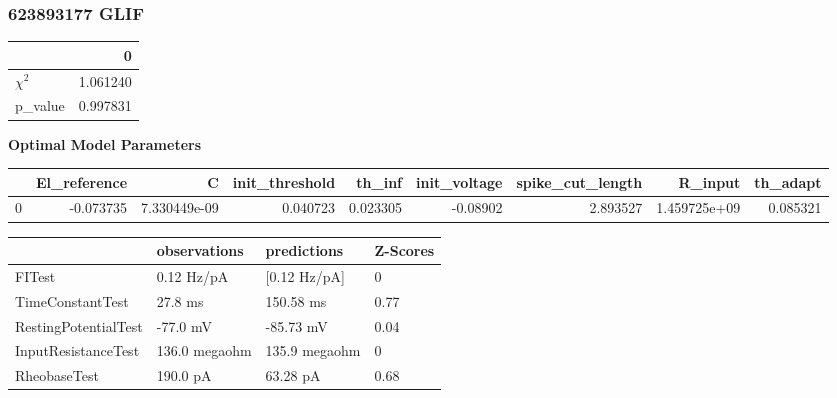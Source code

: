 \subsubsection{623893177 GLIF}\begin{tabular}{lr}
\toprule
{} &         0 \\
\midrule
$\chi^{2}$ &  1.061240 \\
p\_value    &  0.997831 \\
\bottomrule
\end{tabular}
\textbf{Optimal Model Parameters} \begin{tabular}{lrrrrrrrr}
\toprule
{} &  El\_reference &             C &  init\_threshold &    th\_inf &  init\_voltage &  spike\_cut\_length &       R\_input &  th\_adapt \\
\midrule
0 &     -0.073735 &  7.330449e-09 &        0.040723 &  0.023305 &      -0.08902 &          2.893527 &  1.459725e+09 &  0.085321 \\
\bottomrule
\end{tabular}
\begin{tabular}{llll}
\toprule
{} &   observations &    predictions & Z-Scores \\
\midrule
FITest               &     0.12 Hz/pA &   [0.12 Hz/pA] &        0 \\
TimeConstantTest     &        27.8 ms &      150.58 ms &     0.77 \\
RestingPotentialTest &       -77.0 mV &      -85.73 mV &     0.04 \\
InputResistanceTest  &  136.0 megaohm &  135.9 megaohm &        0 \\
RheobaseTest         &       190.0 pA &       63.28 pA &     0.68 \\
\bottomrule
\end{tabular}

